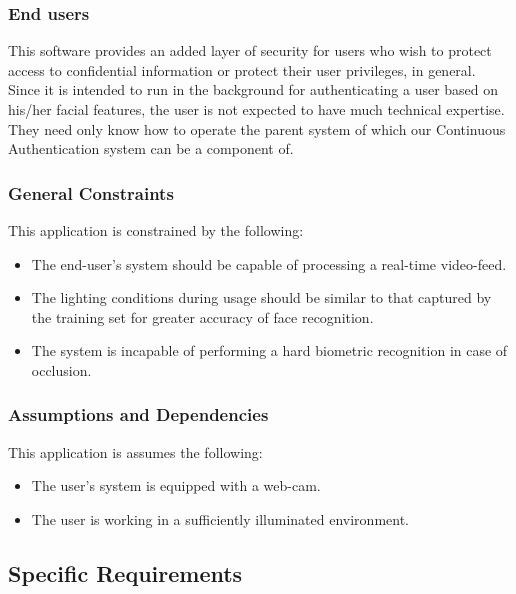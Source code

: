 \documentclass[12pt]{article}			%
\begin{document}
\subsubsection{ End users }
This software provides an added layer of security for users who wish to protect access
to confidential information or protect their user privileges, in general. Since it is intended to run in the background for authenticating a user based on his/her facial features, the user is not expected to have much technical expertise. They need only know how to operate the parent system of which our Continuous Authentication system can be a component of.

\subsubsection{ General Constraints }
This application is constrained by the following:
\begin{itemize}
	\item The end-user's system should be capable of processing a real-time video-feed.
	\item The lighting conditions during usage should be similar to that captured by the training set for greater accuracy of face recognition.
	\item The system is incapable of performing a hard biometric recognition in case of occlusion.
\end{itemize}

\subsubsection{ Assumptions and Dependencies }
This application is assumes the following:
\begin{itemize}
	\item The user's system is equipped with a web-cam.
	\item The user is working in a sufficiently illuminated environment.
\end{itemize}

\subsection{ Specific Requirements }
\end{document}
